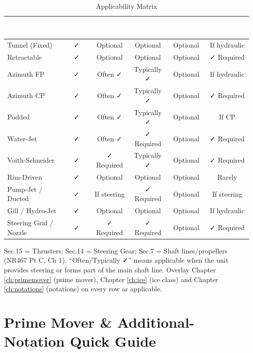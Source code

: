 \documentclass[11pt,a4paper]{report}
\begin{document}
\begin{table}[H]
\centering
\caption{Applicability Matrix}
\begin{tabular}{|l|c|c|c|c|c|}
\hline
\rowcolor{bvblue}
\textcolor{white}{\textbf{Thruster Type}} & \textcolor{white}{\textbf{Sec.15}} & \textcolor{white}{\textbf{Sec.14}} & \textcolor{white}{\textbf{Sec.7}} & \textcolor{white}{\textbf{DP (Pt F)}} & \textcolor{white}{\textbf{Hydraulics}} \\
\hline
Tunnel (Fixed) & ✓ & Optional & Optional & Optional & If hydraulic \\
\hline
Retractable & ✓ & Optional & Optional & Optional & ✓ Required \\
\hline
Azimuth FP & ✓ & Often ✓ & Typically ✓ & Optional & If hydraulic \\
\hline
Azimuth CP & ✓ & Often ✓ & Typically ✓ & Optional & ✓ Required \\
\hline
Podded & ✓ & Often ✓ & Typically ✓ & Optional & If CP \\
\hline
Water-Jet & ✓ & Often ✓ & ✓ Required & Optional & ✓ Required \\
\hline
Voith-Schneider & ✓ & ✓ Required & Typically ✓ & Optional & ✓ Required \\
\hline
Rim-Driven & ✓ & Optional & Optional & Optional & Rarely \\
\hline
Pump-Jet / Ducted & ✓ & If steering & ✓ Required & Optional & If steering \\
\hline
Gill / Hydro-Jet & ✓ & Optional & Optional & Optional & If hydraulic \\
\hline
Steering Grid / Nozzle & ✓ & ✓ Required & ✓ Required & Optional & ✓ Required \\
\hline
\end{tabular}

\vspace{0.2cm}
{\footnotesize Sec.15 = Thrusters; Sec.14 = Steering Gear; Sec.7 = Shaft
lines/propellers (NR467 Pt C, Ch 1). ``Often/Typically ✓'' means applicable when
the unit provides steering or forms part of the main shaft line. Overlay
Chapter \ref{ch:primemover} (prime mover), Chapter \ref{ch:ice} (ice class) and
Chapter \ref{ch:notations} (notations) on every row as applicable.}
\end{table}

\section{Prime Mover \& Additional-Notation Quick Guide}
\end{document}
